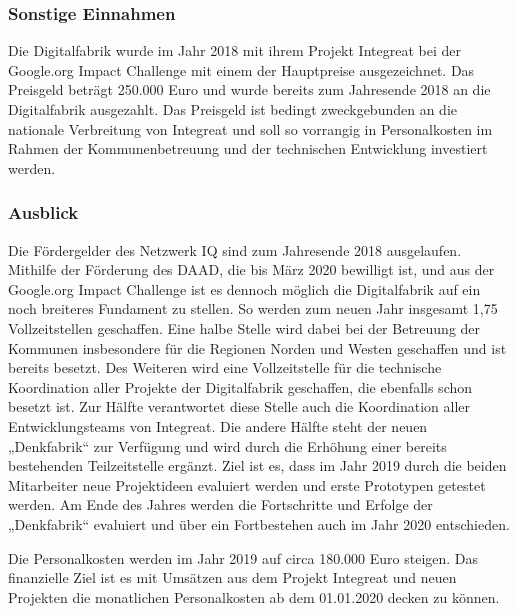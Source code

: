 \documentclass[12pt, a4paper]{article} %
\begin{document}
\hypertarget{sonstige-einnahmen}{%
\subsubsection{Sonstige Einnahmen}\label{sonstige-einnahmen}}

Die Digitalfabrik wurde im Jahr 2018 mit ihrem Projekt Integreat bei der
Google.org Impact Challenge mit einem der Hauptpreise ausgezeichnet. Das
Preisgeld beträgt 250.000 Euro und wurde bereits zum Jahresende 2018 an
die Digitalfabrik ausgezahlt. Das Preisgeld ist bedingt zweckgebunden an
die nationale Verbreitung von Integreat und soll so vorrangig in
Personalkosten im Rahmen der Kommunenbetreuung und der technischen
Entwicklung investiert werden.

\hypertarget{ausblick}{%
\subsubsection{Ausblick}\label{ausblick}}

Die Fördergelder des Netzwerk IQ sind zum Jahresende 2018 ausgelaufen.
Mithilfe der Förderung des DAAD, die bis März 2020 bewilligt ist, und
aus der Google.org Impact Challenge ist es dennoch möglich die
Digitalfabrik auf ein noch breiteres Fundament zu stellen. So werden zum
neuen Jahr insgesamt 1,75 Vollzeitstellen geschaffen. Eine halbe Stelle
wird dabei bei der Betreuung der Kommunen insbesondere für die Regionen
Norden und Westen geschaffen und ist bereits besetzt. Des Weiteren wird
eine Vollzeitstelle für die technische Koordination aller Projekte der
Digitalfabrik geschaffen, die ebenfalls schon besetzt ist. Zur Hälfte
verantwortet diese Stelle auch die Koordination aller Entwicklungsteams
von Integreat. Die andere Hälfte steht der neuen „Denkfabrik“ zur
Verfügung und wird durch die Erhöhung einer bereits bestehenden
Teilzeitstelle ergänzt. Ziel ist es, dass im Jahr 2019 durch die beiden
Mitarbeiter neue Projektideen evaluiert werden und erste Prototypen
getestet werden. Am Ende des Jahres werden die Fortschritte und Erfolge
der „Denkfabrik“ evaluiert und über ein Fortbestehen auch im Jahr 2020
entschieden.

Die Personalkosten werden im Jahr 2019 auf circa 180.000 Euro steigen.
Das finanzielle Ziel ist es mit Umsätzen aus dem Projekt Integreat und
neuen Projekten die monatlichen Personalkosten ab dem 01.01.2020 decken
zu können.
\end{document}

